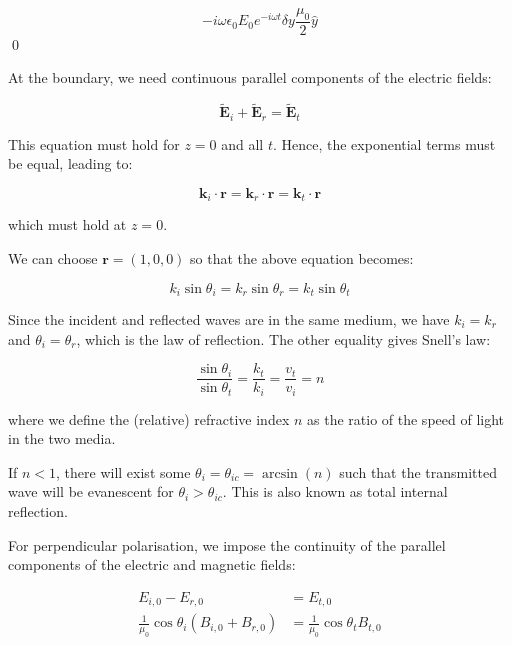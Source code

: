 \documentclass[12pt]{article}
\begin{document}
\begin{equation}
    -i\omega \epsilon_{0} E_{0} e^{-i\omega t} \delta y \frac{\mu_{0}}{2} \hat{y}
\end{equation}
\qed



At the boundary, we need continuous parallel components of the electric fields:

\begin{equation}
    \tilde{\mathbf{E}}_{i} + \tilde{\mathbf{E}}_{r} = \tilde{\mathbf{E}}_{t}
\end{equation}

This equation must hold for $z = 0$ and all $t$. Hence, the exponential terms must be equal, leading to:

\begin{equation}
    \mathbf{k}_{i} \cdot \mathbf{r} = \mathbf{k}_{r} \cdot \mathbf{r} = \mathbf{k}_{t} \cdot \mathbf{r}
\end{equation}

which must hold at $z = 0$.

We can choose $\mathbf{r} = (1, 0, 0)$ so that the above equation becomes:

\begin{equation}
    k_{i} \sin{\theta_{i}} = k_{r} \sin{\theta_{r}} = k_{t} \sin{\theta_{t}}
\end{equation}

Since the incident and reflected waves are in the same medium, we have $k_{i} = k_{r}$ and $\theta_{i} = \theta_{r}$, which is the law of reflection. The other equality gives Snell's law:

\begin{equation}
    \frac{\sin{\theta_{i}}}{\sin{\theta_{t}}} = \frac{k_{t}}{k_{i}} = \frac{v_{t}}{v_{i}} = n
\end{equation}

where we define the (relative) refractive index $n$ as the ratio of the speed of light in the two media.

If $n < 1$, there will exist some $\theta_{i} = \theta_{ic} = \arcsin{(n)}$ such that the transmitted wave will be evanescent for $\theta_{i} > \theta_{ic}$. This is also known as total internal reflection.

For perpendicular polarisation, we impose the continuity of the parallel components of the electric and magnetic fields:

\begin{equation}
\begin{split}
    E_{i, 0} - E_{r, 0} &= E_{t, 0} \\
    \frac{1}{\mu_{0}} \cos{\theta_{i}} (B_{i, 0} + B_{r, 0}) &= \frac{1}{\mu_{0}} \cos{\theta_{t}} B_{t, 0}
\end{split}
\end{equation}
\end{document}
